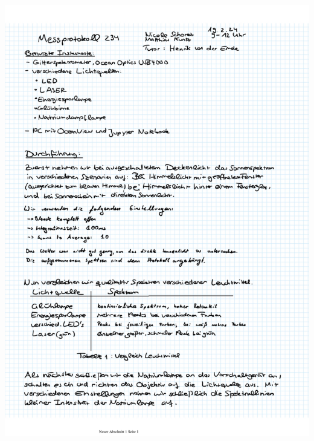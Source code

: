 \documentclass{article}
\begin{document}
\includegraphics[width=\textwidth]{graphics/mess1.jpeg}
\newpage
\end{document}
